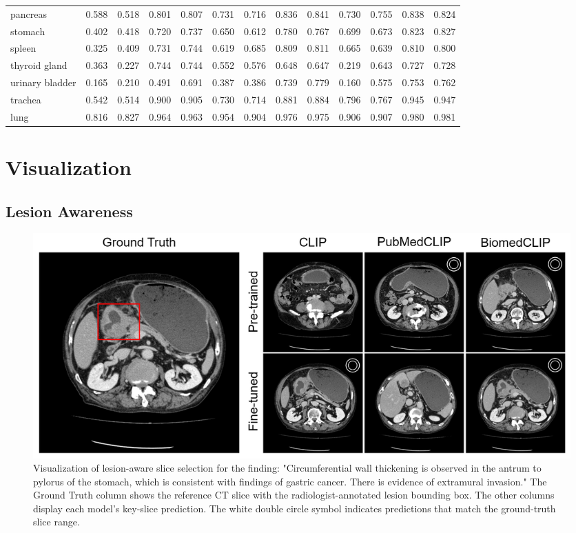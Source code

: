 \documentclass[bioengineering,article,submit,pdftex,moreauthors]{Definitions/mdpi}
\begin{document}
\begin{landscape}
\begin{table}[ht]
\begin{tabular}{l*{6}{cc}}
    pancreas          & 0.588 & 0.518 & 0.801 & 0.807 & 0.731 & 0.716 & 0.836 & 0.841 & 0.730 & 0.755 & 0.838 & 0.824 \\
    stomach           & 0.402 & 0.418 & 0.720 & 0.737 & 0.650 & 0.612 & 0.780 & 0.767 & 0.699 & 0.673 & 0.823 & 0.827 \\
    spleen            & 0.325 & 0.409 & 0.731 & 0.744 & 0.619 & 0.685 & 0.809 & 0.811 & 0.665 & 0.639 & 0.810 & 0.800 \\
    thyroid gland     & 0.363 & 0.227 & 0.744 & 0.744 & 0.552 & 0.576 & 0.648 & 0.647 & 0.219 & 0.643 & 0.727 & 0.728 \\
    urinary bladder   & 0.165 & 0.210 & 0.491 & 0.691 & 0.387 & 0.386 & 0.739 & 0.779 & 0.160 & 0.575 & 0.753 & 0.762 \\
    trachea           & 0.542 & 0.514 & 0.900 & 0.905 & 0.730 & 0.714 & 0.881 & 0.884 & 0.796 & 0.767 & 0.945 & 0.947 \\
    lung              & 0.816 & 0.827 & 0.964 & 0.963 & 0.954 & 0.904 & 0.976 & 0.975 & 0.906 & 0.907 & 0.980 & 0.981 \\
    \bottomrule
  \end{tabular}
\end{table}
\end{landscape}


\section{Visualization}\label{app:visualization}
\subsection{Lesion Awareness}

\begin{figure}[ht]
  \centering
  \includegraphics[width=1\textwidth]{./figures/app_lesion_aware_inst6_2.png}
  \caption{Visualization of lesion-aware slice selection for the finding: "Circumferential wall thickening is observed in the antrum to pylorus of the stomach, which is consistent with findings of gastric cancer. 
  There is evidence of extramural invasion."
  The Ground Truth column shows the reference CT slice with the radiologist-annotated lesion bounding box.
  The other columns display each model’s key-slice prediction.
  The white double circle symbol indicates predictions that match the ground-truth slice range.}
  \label{fig:lesion_aware_inst6}
\end{figure}
\end{document}
